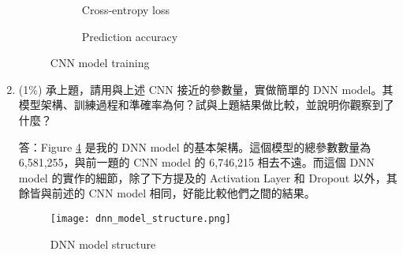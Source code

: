 \documentclass[12pt,a4paper]{extarticle}
\begin{document}
\begin{enumerate}
  \begin{figure}[ht]
    \begin{subfigure}[t]{0.5\textwidth}
    \caption{Cross-entropy loss}
    \label{fig:cnn-epoch-loss}
    \end{subfigure}
    \begin{subfigure}[t]{0.5\textwidth}
      \caption{Prediction accuracy}
      \label{fig:cnn-epoch-acc}
    \end{subfigure}
    \caption{CNN model training}
    \label{fig:cnn-training}
  \end{figure}

	\item (1\%) 承上題，請用與上述 CNN 接近的參數量，實做簡單的 DNN model。其模型架構、訓練過程和準確率為何？試與上題結果做比較，並說明你觀察到了什麼？
  \par 答：Figure \ref{fig:dnn-model-structure} 是我的 DNN model 的基本架構。這個模型的總參數數量為 6,581,255，與前一題的 CNN model 的 6,746,215 相去不遠。而這個 DNN model 的實作的細節，除了下方提及的 Activation Layer 和 Dropout 以外，其餘皆與前述的 CNN model 相同，好能比較他們之間的結果。

  \begin{figure}[ht]
    \centering
    \texttt{[image: dnn\_model\_structure.png]}
    \caption{DNN model structure}
    \label{fig:dnn-model-structure}
  \end{figure}


\end{enumerate}
\end{document}
